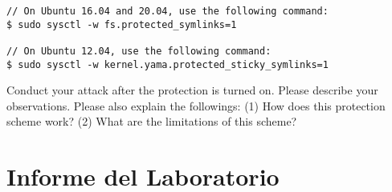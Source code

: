 \begin{lstlisting}
// On Ubuntu 16.04 and 20.04, use the following command:
$ sudo sysctl -w fs.protected_symlinks=1

// On Ubuntu 12.04, use the following command:
$ sudo sysctl -w kernel.yama.protected_sticky_symlinks=1
\end{lstlisting}

Conduct your attack after the protection is turned on.  
Please describe your observations. Please also explain
the followings: (1) How does this protection scheme work?
(2) What are the limitations of this scheme?






\section{Informe del Laboratorio}





